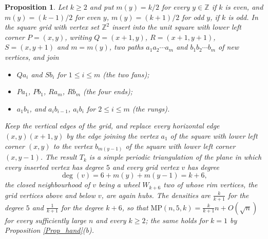 \documentclass[12pt,a4paper]{article}%
\newtheorem{proposition}[theorem]{Proposition}
\begin{document}
\begin{proposition}
\label{Prop_wheel}Let $k\geq 2$ and put $m(y)=k/2$ for every $y\in \mathbb{Z}$ if $k$ is even, and $m(y)=(k-1)/2$ for
even $y$, $m(y)=(k+1)/2$ for odd $y$, if $k$ is odd. In the square grid with vertex set $\mathbb{Z}^{2}$ insert into
the unit square with lower left corner $P=(x,y)$, writing $Q=(x+1,y)$, $R=(x+1,y+1)$, $S=(x,y+1)$ and $m=m(y)$, two
paths $a_{1}a_{2}\cdots a_{m}$ and $b_{1}b_{2}\cdots b_{m}$ of new vertices, and join

\begin{itemize}
\item[\textrm{(i)}] $Qa_{i}$ and $Sb_{i}$ for $1\leq i\leq m$ \emph{(the two fans)};
\item[\textrm{(ii)}] $Pa_{1}$, $Pb_{1}$, $Ra_{m}$, $Rb_{m}$ \emph{(the four ends)};
\item[\textrm{(iii)}] $a_{1}b_{1}$, and $a_{i}b_{i-1}$, $a_{i}b_{i}$ for $2\leq i\leq m$ \emph{(the rungs)}.
\end{itemize}

Keep the vertical edges of the grid, and replace every horizontal edge $(x,y)(x+1,y)$ by the edge joining the vertex
$a_{1}$ of the square with lower left corner $(x,y)$ to the vertex $b_{m(y-1)}$ of the square with lower left corner
$(x,y-1)$. The result $T_{k}$ is a simple periodic triangulation of the plane in which every inserted vertex has degree
$5$ and every grid vertex $v$ has degree
\[
\deg (v)=6+m(y)+m(y-1)=k+6 ,
\]
the closed neighbourhood of $v$ being a wheel $W_{k+6}$ two of whose rim vertices, the grid vertices above and below
$v$, are again hubs. The densities are $\frac{k}{k+1}$ for the degree $5$ and $\frac{1}{k+1}$ for the degree $k+6$,
so that $\mathrm{MP}(n,5,k)=\frac{k}{k+1}n+O(\sqrt{n})$ for every sufficiently large $n$ and every $k\geq 2$; the
same holds for $k=1$ by Proposition \ref{Prop_hand}(b).
\end{proposition}
\end{document}
